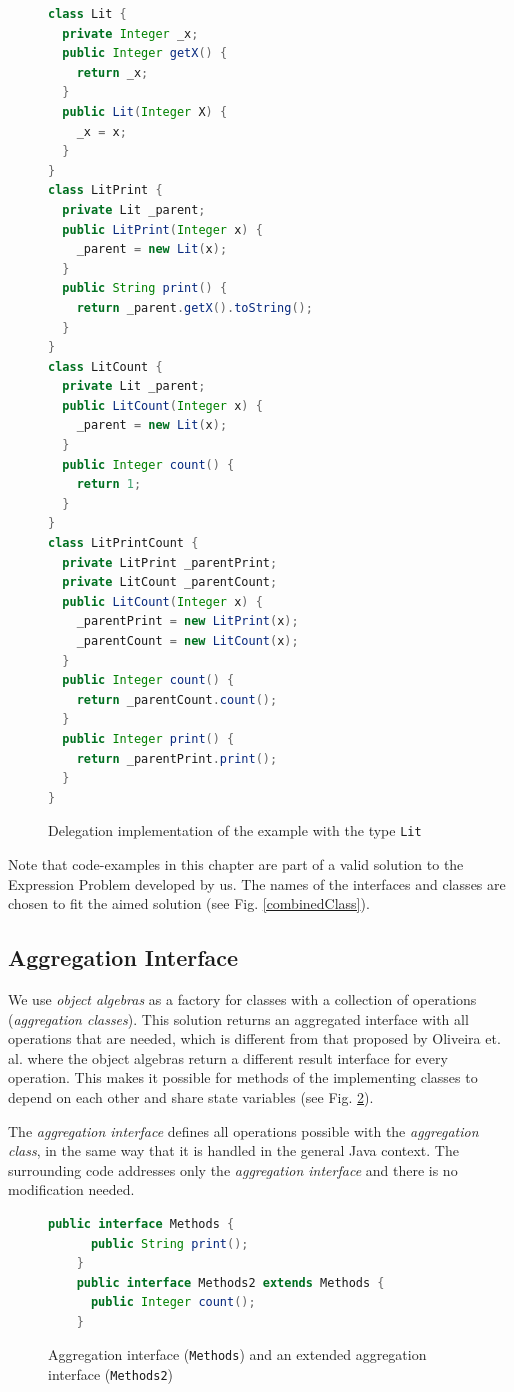 \documentclass{report}
\begin{document}
\begin{figure}[H]
\begin{lstlisting}[language=java]
class Lit {
  private Integer _x;
  public Integer getX() {
    return _x;
  }
  public Lit(Integer X) {
    _x = x;
  }
}
class LitPrint {
  private Lit _parent;
  public LitPrint(Integer x) {
    _parent = new Lit(x);
  }
  public String print() {
    return _parent.getX().toString();
  }
}
class LitCount {
  private Lit _parent;
  public LitCount(Integer x) {
    _parent = new Lit(x);
  }
  public Integer count() {
    return 1;
  }
}
class LitPrintCount {
  private LitPrint _parentPrint;
  private LitCount _parentCount;
  public LitCount(Integer x) {
    _parentPrint = new LitPrint(x);
    _parentCount = new LitCount(x);
  }
  public Integer count() {
    return _parentCount.count();
  }
  public Integer print() {
    return _parentPrint.print();
  }
}
\end{lstlisting}
\caption{Delegation implementation of the example with the type \lstinline{Lit}}
\label{delegationExample}
\end{figure}

Note that code-examples in this chapter are part of a valid solution to the Expression Problem developed by us. The names of the interfaces and classes are chosen to fit the aimed solution (see Fig. \ref{combinedClass}).

\subsection{Aggregation Interface}

We use \emph{object algebras} as a factory for classes with a collection of operations (\emph{aggregation classes}). This solution returns an aggregated interface with all operations that are needed, which is different from that proposed by Oliveira et. al. where the object algebras return a different result interface for every operation. This makes it possible for methods of the implementing classes to depend on each other and share state variables (see Fig. \ref{aggregationInterfaces}).

The \emph{aggregation interface} defines all operations possible with the \emph{aggregation class}, in the same way that it is handled in the general Java context. The surrounding code addresses only the \emph{aggregation interface} and there is no modification needed.

\begin{figure}[h]
\begin{lstlisting}[language=java]
    public interface Methods {
      public String print();
    }
    public interface Methods2 extends Methods {
      public Integer count();
    }
\end{lstlisting}
\caption{Aggregation interface (\lstinline{Methods}) and an extended aggregation interface (\lstinline{Methods2})}
\label{aggregationInterfaces}
\end{figure}
\end{document}

